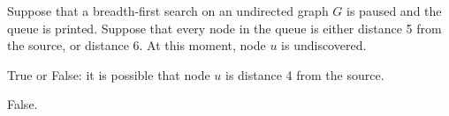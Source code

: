 \begin{prob}

    Suppose that a breadth-first search on an undirected graph $G$ is paused
    and the queue is printed. Suppose that every node in the queue is either
    distance 5 from the source, or distance 6. At this moment, node $u$ is
    undiscovered.

    True or False: it is possible that
    node $u$ is distance 4 from the source.

    \begin{soln}
        False.
    \end{soln}

\end{prob}

